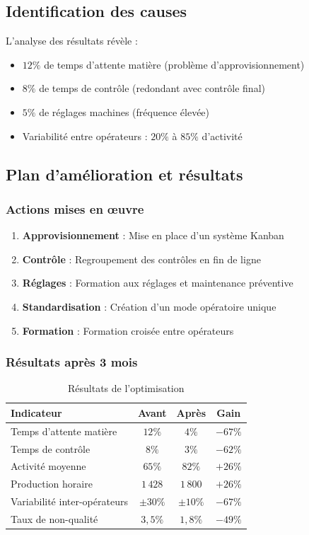 \documentclass[a4paper,12pt]{article}
\begin{document}
\subsection{Identification des causes}

L'analyse des résultats révèle :
\begin{itemize}
    \item $12\%$ de temps d'attente matière (problème d'approvisionnement)
    \item $8\%$ de temps de contrôle (redondant avec contrôle final)
    \item $5\%$ de réglages machines (fréquence élevée)
    \item Variabilité entre opérateurs : $20\%$ à $85\%$ d'activité
\end{itemize}

\subsection{Plan d'amélioration et résultats}

\subsubsection{Actions mises en œuvre}

\begin{enumerate}
    \item \textbf{Approvisionnement} : Mise en place d'un système Kanban
    \item \textbf{Contrôle} : Regroupement des contrôles en fin de ligne
    \item \textbf{Réglages} : Formation aux réglages et maintenance préventive
    \item \textbf{Standardisation} : Création d'un mode opératoire unique
    \item \textbf{Formation} : Formation croisée entre opérateurs
\end{enumerate}

\subsubsection{Résultats après 3 mois}

\begin{table}[ht]
\centering
\begin{tabular}{|l|c|c|c|}
\hline
\textbf{Indicateur} & \textbf{Avant} & \textbf{Après} & \textbf{Gain} \\
\hline
Temps d'attente matière & $12\%$ & $4\%$ & $-67\%$ \\
Temps de contrôle & $8\%$ & $3\%$ & $-62\%$ \\
Activité moyenne & $65\%$ & $82\%$ & $+26\%$ \\
Production horaire & $1\,428$ & $1\,800$ & $+26\%$ \\
Variabilité inter-opérateurs & $\pm 30\%$ & $\pm 10\%$ & $-67\%$ \\
Taux de non-qualité & $3,5\%$ & $1,8\%$ & $-49\%$ \\
\hline
\end{tabular}
\caption{Résultats de l'optimisation}
\end{table}
\end{document}
